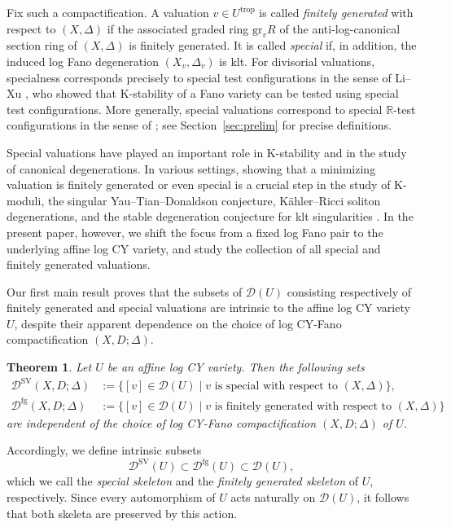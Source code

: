\documentclass[reqno, 12pt]{amsart}
\newtheorem{thm}[prop]{Theorem}
\theoremstyle{definition}
\newcommand{\bR}{\mathbb{R}}
\newcommand{\cD}{\mathcal{D}}
\newcommand{\gr}{\mathrm{gr}}
\newcommand{\trop}{\mathrm{trop}}
\newcommand{\SV}{\mathrm{SV}}
\newcommand{\rfg}{\mathrm{fg}}
\numberwithin{equation}{section}
\begin{document}
Fix such a compactification. A valuation $v\in U^{\trop}$ is called \emph{finitely generated} with respect to $(X,\Delta)$ if the associated graded ring $\gr_v R$ of the anti-log-canonical section ring of $(X,\Delta)$ is finitely generated. It is called \emph{special} if, in addition, the induced log Fano degeneration $(X_v,\Delta_v)$ is klt.
For divisorial valuations, specialness corresponds precisely to special test
configurations in the sense of Li--Xu \cite{LX14}, who showed that K-stability of a Fano variety can be tested using special test configurations.
More generally, special valuations correspond to special $\bR$-test configurations in the sense of \cite{DS20, HL20,BLXZ23}; see Section~\ref{sec:prelim} for precise definitions.

Special valuations have played an important role in K-stability and in the study of canonical degenerations. In various settings, showing that a minimizing valuation is finitely generated or even special is a crucial step in the study of K-moduli, the singular Yau--Tian--Donaldson conjecture, K\"ahler--Ricci soliton degenerations, and the stable degeneration conjecture for klt singularities \cite{LXZ22,BLXZ23,XZ22,Che25}. In the present paper, however, we shift the focus from a fixed log Fano pair to the underlying affine log CY variety, and study the collection of all special and finitely generated valuations.

Our first main result proves that the subsets of $\cD(U)$ consisting respectively of finitely generated and special valuations are intrinsic to the affine log CY variety $U$, despite their apparent dependence on the choice of log CY-Fano compactification $(X,D;\Delta)$.


\begin{thm}\label{thm:main}
Let $U$ be an affine log CY variety. Then the following sets
\begin{align*}
 \cD^{\SV}(X, D; \Delta)& := \{[v]\in \cD(U)\mid v\textrm{ is special with respect to } (X,\Delta)\},\\
\cD^{\rfg}(X,D;\Delta)& :=\{[v]\in \cD(U)\mid v\textrm{ is finitely generated with respect to } (X,\Delta)\}
\end{align*}
are independent of the choice of log CY-Fano compactification $(X,D;\Delta)$ of $U$. 
\end{thm}

Accordingly, we define intrinsic subsets
\[
\cD^{\SV}(U)\subset \cD^{\rfg}(U)\subset \cD(U),
\]
which we call the \emph{special skeleton} and the \emph{finitely generated skeleton} of $U$, respectively. Since every automorphism of $U$ acts naturally on $\cD(U)$, it follows that both skeleta are preserved by this action.
\end{document}
